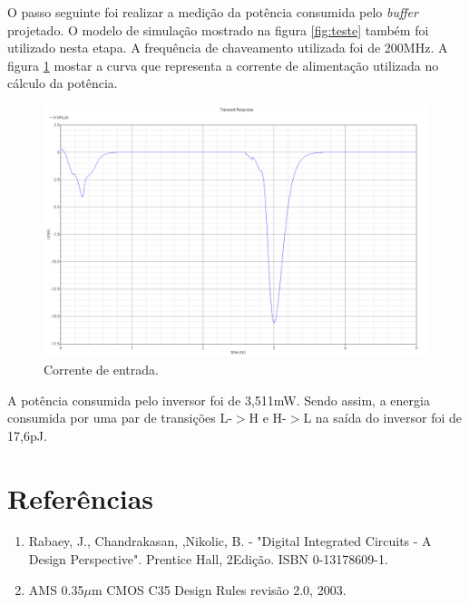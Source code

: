 \documentclass[a4paper,10pt] {article}
\begin{document}
O passo seguinte foi realizar a medição da potência consumida pelo \textit{buffer} projetado. O modelo de simulação mostrado na figura \ref{fig:teste} também foi utilizado nesta etapa. A frequência de chaveamento utilizada foi de 200MHz. A figura \ref{fig:corrente} mostar a curva que representa a corrente de alimentação utilizada no cálculo da potência.

\begin{figure} [h]
	\centering
	\includegraphics[scale=0.1]{Corrente.png}
	\caption{Corrente de entrada.}
	\label{fig:corrente}
\end{figure}

A potência consumida pelo inversor foi de 3,511mW. Sendo assim, a energia consumida por uma par de transições L-$>$H e H-$>$L na saída do inversor foi de 17,6pJ.

\section{Referências}
\begin{enumerate}
\item Rabaey, J., Chandrakasan, \textordfeminine,Nikolic, B. - "Digital Integrated Circuits - A Design Perspective". Prentice Hall, 2\textordfeminine Edição. ISBN 0-13178609-1.
\item AMS 0.35$\mu$m CMOS C35 Design Rules revisão 2.0, 2003.
\end{enumerate}
\end{document}
